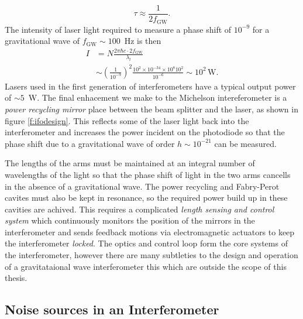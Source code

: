 \begin{equation}
\tau \approx \frac{1}{2 f_\mathrm{GW}}.
\end{equation}
The intensity of laser light required to measure a phase shift of $10^{-9}$
for a gravitational wave of $f_\mathrm{GW} \sim 100$~Hz is then
\begin{equation}
\begin{split}
I &= N \frac{2 \pi \hbar c \cdot 2f_\mathrm{GW}}{\lambda_l} \\
&\sim \left(\frac{1}{10^{-9}}\right)^2 
\frac{10^2 \times 10^{-34} \times 10^{8} 10^2 } { 10^{-6} } \sim 10^2\,
\mathrm{W}.
\end{split}
\end{equation}
Lasers used in the first generation of interferometers have a typical output
power of $\sim 5$~W. The final enhacement we make to the Michelson
intereferometer is a \emph{power recycling mirror} place between the beam
splitter and the laser, as shown in figure \ref{f:ifodesign}. This reflects
some of the laser light back into the interferometer and increases the power
incident on the photodiode so that the phase shift due to a gravitational wave
of order $h \sim 10^{-21}$ can be measured.

The lengths of the arms must be maintained at an integral number of
wavelengths of the light so that the phase shift of light in the two arms
cancells in the absence of a gravitational wave. The power recycling and
Fabry-Perot cavites must also be kept in resonance, so the required power
build up in these cavities are achived. This requires a complicated
\emph{length sensing and control system}\cite{sigg} which continuously
monitors the position of the mirrors in the interferometer and sends feedback
motions via electromagnetic actuators to keep the interferometer
\emph{locked}. The optics and control loop form the core systems of the
interferometer, however there are many subtleties to the design and operation
of a gravitataional wave interferometer this which are outside the scope of
this thesis.

\subsection{Noise sources in an Interferometer}
\label{ss:noise}

